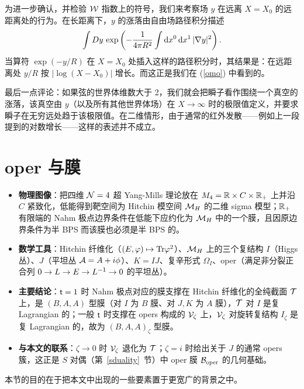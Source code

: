 为进一步确认，并检验 ${\mathcal W}$ 指数上的符号，我们来考察场 $y$ 在远离 $X=X_0$ 的远距离处的行为。在长距离下，$y$ 的涨落由自由场路径积分描述
\begin{equation}\label{donel}\int Dy\,\exp\left(-\frac{1}{4\pi R^2}\int {\mathrm d} x^0\,{\mathrm d} x^1\,|\nabla y|^2\right).
\end{equation}
当算符 $\exp(-y/R)$ 在 $X=X_0$ 处插入这样的路径积分时，其结果是：在远距离处 $y/R$ 按 $|\log(X-X_0)|$ 增长。而这正是我们在 (\ref{omo}) 中看到的。

最后一点评论：如果弦的世界体维数大于 2，我们就会把瞬子看作围绕一个真空的涨落，该真空由 $y$（以及所有其他世界体场）在 $X\to\infty$ 时的极限值定义，并要求瞬子在无穷远处趋于该极限值。在二维情形，由于通常的红外发散——例如上一段提到的对数增长——这样的表述并不成立。




\section{oper 与膜}\label{opbranes}

\begin{keytakeaways}
\begin{itemize}\setlength{\itemsep}{2pt}
  \item \textbf{物理图像}：把四维 ${\mathcal N}=4$ 超 Yang-Mills 理论放在 $M_4={\mathbb R}\times C\times{\mathbb R}_+$ 上并沿 $C$ 紧致化，低能得到靶空间为 Hitchin 模空间 ${\mathcal M}_H$ 的二维 sigma 模型；${\mathbb R}_+$ 有限端的 Nahm 极点边界条件在低能下应约化为 ${\mathcal M}_H$ 中的一个膜，且因原边界条件为半 BPS 而该膜也必须是半 BPS 的。
  \item \textbf{数学工具}：Hitchin 纤维化（$(E,\varphi)\mapsto{\mathrm {Tr}}\varphi^2$）、${\mathcal M}_H$ 上的三个复结构 $I$（Higgs 丛）、$J$（平坦丛 ${\mathcal A}=A+i\phi$）、$K=IJ$、复辛形式 $\Omega_I$、oper（满足非分裂正合列 $0\to{ L}\to E\to{ L}^{-1}\to0$ 的平坦丛）。
  \item \textbf{主要结论}：${ \sf t}=1$ 时 Nahm 极点对应的膜支撑在 Hitchin 纤维化的全纯截面 ${\mathcal T}$ 上，是 $(B,A,A)$ 型膜（对 $I$ 为 $B$ 膜、对 $J,K$ 为 $A$ 膜），${\mathcal T}$ 对 $I$ 是复 Lagrangian 的；一般 ${ \sf t}$ 时支撑在 opers 构成的 ${\mathcal V}_\zeta$ 上，${\mathcal V}_\zeta$ 对旋转复结构 $I_\zeta$ 是复 Lagrangian 的，故为 $(B,A,A)_\zeta$ 型膜。
  \item \textbf{与本文的联系}：$\zeta\to0$ 时 ${\mathcal V}_\zeta$ 退化为 ${\mathcal T}$；$\zeta=i$ 时给出关于 $J$ 的通常 opers 簇，这正是 $S$ 对偶（第~\ref{sduality}~节）中 oper 膜 ${\mathcal B_{\mathrm{oper}}}$ 的几何基础。
\end{itemize}
\end{keytakeaways}

本节的目的在于把本文中出现的一些要素置于更宽广的背景之中。

